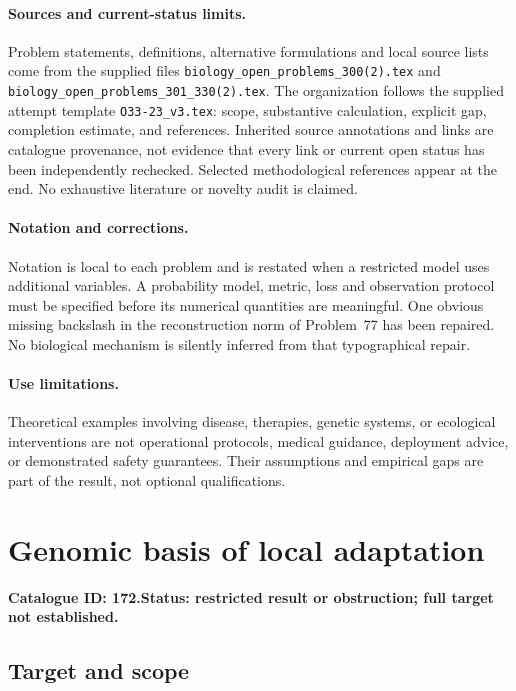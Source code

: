 \documentclass[11pt]{article}
\begin{document}
\paragraph{Sources and current-status limits.}
Problem statements, definitions, alternative formulations and local source lists
come from the supplied files
\texttt{biology\_open\_problems\_300(2).tex} and
\texttt{biology\_open\_problems\_301\_330(2).tex}.
The organization follows the supplied attempt template
\texttt{O33-23\_v3.tex}: scope, substantive calculation, explicit gap,
completion estimate, and references. Inherited source annotations and links are
catalogue provenance, not evidence that every link or current open status has
been independently rechecked. Selected methodological references appear at the
end. No exhaustive literature or novelty audit is claimed.

\paragraph{Notation and corrections.}
Notation is local to each problem and is restated when a restricted model uses
additional variables. A probability model, metric, loss and observation protocol
must be specified before its numerical quantities are meaningful. One obvious
missing backslash in the reconstruction norm of Problem~77 has been repaired.
No biological mechanism is silently inferred from that typographical repair.

\paragraph{Use limitations.}
Theoretical examples involving disease, therapies, genetic systems, or ecological
interventions are not operational protocols, medical guidance, deployment advice,
or demonstrated safety guarantees. Their assumptions and empirical gaps are part
of the result, not optional qualifications.

\setcounter{section}{171}
\section{Genomic basis of local adaptation}
\label{prob:172}
\noindent\textbf{Catalogue ID: 172.}\quad \textbf{Status: restricted result or obstruction; full target not established.}
\subsection{Target and scope}
\end{document}
